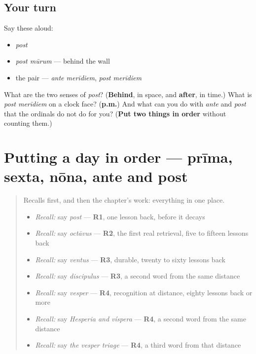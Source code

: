 \subsection*{Your turn}
Say these aloud:

\begin{itemize}
\raggedright
  \item \emph{post}
  \item \emph{post mūrum} — behind the wall
  \item the pair — \emph{ante merīdiem}, \emph{post merīdiem}
\end{itemize}

\begin{tcolorbox}[breakable,colback=teal!4,colframe=teal!35!black,title={Before you move on}]
What are the two senses of \emph{post}? (\textbf{Behind}, in space, and \textbf{after}, in time.) What is \emph{post merīdiem} on a clock face? (\textbf{p.m.}) And what can you do with \emph{ante} and \emph{post} that the ordinals do not do for you? (\textbf{Put two things in order} without counting them.)
\end{tcolorbox}
\section[prīma hōra — sexta hōra — nōna hōra]{Putting a day in order — prīma, sexta, nōna, ante and post}

\label{lesson:LA-C57-practice}



\begin{quote}
Recalls first, and then the chapter's work: everything in one place.

\begin{itemize}
\raggedright
  \item \emph{Recall:} say \emph{post} — \textbf{R1}, one lesson back, before it decays
  \item \emph{Recall:} say \emph{octāvus} — \textbf{R2}, the first real retrieval, five to fifteen lessons back
  \item \emph{Recall:} say \emph{ventus} — \textbf{R3}, durable, twenty to sixty lessons back
  \item \emph{Recall:} say \emph{discipulus} — \textbf{R3}, a second word from the same distance
  \item \emph{Recall:} say \emph{vesper} — \textbf{R4}, recognition at distance, eighty lessons back or more
  \item \emph{Recall:} say \emph{Hesperia and víspera} — \textbf{R4}, a second word from the same distance
  \item \emph{Recall:} say \emph{the vesper triage} — \textbf{R4}, a third word from that distance
\end{itemize}
\end{quote}

